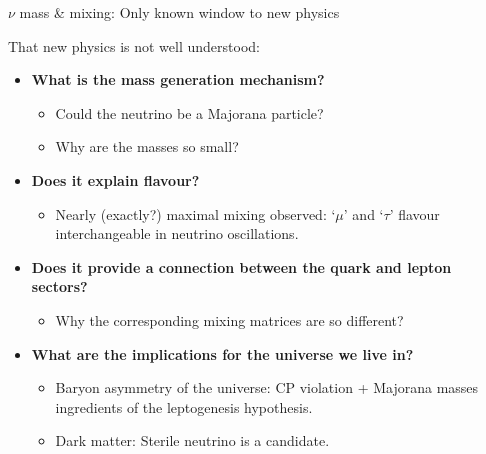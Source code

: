 % 
% 

\begin{frame}{$\nu$ mass \& mixing: Only known window to new physics}

That new physics is not well understood:\\
\vspace{0.2cm}
{
\begin{itemize}
  \item {\bf What is the mass generation mechanism?}
  {
    \begin{itemize}
       \item Could the neutrino be a Majorana particle?
       \item Why are the masses so small?
    \end{itemize}
  }
  \item {\bf Does it explain flavour?}
  {
    \begin{itemize}
       \item Nearly (exactly?) maximal mixing observed: `$\mu$' and `$\tau$' flavour interchangeable in neutrino oscillations.
    \end{itemize}
  }
  \item {\bf Does it provide a connection between the quark and lepton sectors?}
  {
    \begin{itemize}
       \item Why the corresponding mixing matrices are so different?
    \end{itemize}
  }
  \item {\bf What are the implications for the universe we live in?}
  {
    \begin{itemize}
       \item Baryon asymmetry of the universe: CP violation + Majorana masses ingredients of the leptogenesis hypothesis.
       \item Dark matter: Sterile neutrino is a candidate.
    \end{itemize}
  }
\end{itemize}
}
\end{frame}





